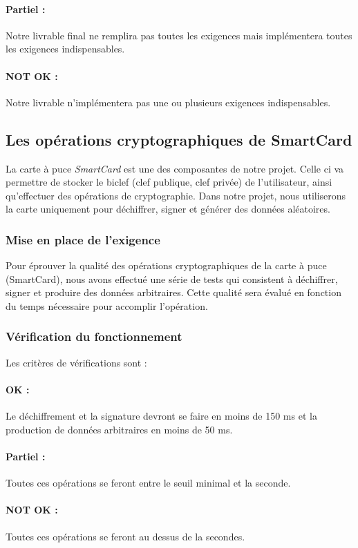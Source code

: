\documentclass[a4paper,11pt,french]{article}
\begin{document}
\paragraph{Partiel : } Notre livrable final ne remplira pas toutes les
exigences mais implémentera toutes les exigences indispensables.
\paragraph{NOT OK : } Notre livrable n'implémentera pas une ou plusieurs
exigences indispensables.

\subsection{Les opérations cryptographiques de SmartCard}
	La carte à puce \emph{SmartCard} est une des composantes de notre
projet. Celle ci va permettre de stocker le biclef (clef publique, clef
privée) de l'utilisateur, ainsi qu'effectuer des opérations de cryptographie.
Dans notre projet, nous utiliserons la carte uniquement pour déchiffrer,
signer et générer des données aléatoires.
\subsubsection{Mise en place de l'exigence}
	Pour éprouver la qualité des opérations cryptographiques de la carte
à puce (SmartCard), nous avons effectué une série de tests qui consistent à
déchiffrer, signer et produire des données arbitraires. Cette qualité sera
évalué en fonction du temps nécessaire pour accomplir l'opération.

\subsubsection{Vérification du fonctionnement}
	Les critères de vérifications sont :
\paragraph{OK : } Le déchiffrement et la signature devront se faire en moins
de 150 ms et la production de données arbitraires en moins de 50 ms.
\paragraph{Partiel : } Toutes ces opérations se feront entre le seuil minimal
et la seconde.
\paragraph{NOT OK : } Toutes ces opérations se feront au dessus de la secondes.
\end{document}
